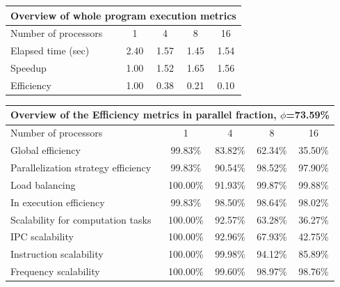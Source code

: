 \begin{tabular}{|l|c|c|c|c|}
\hline
\multicolumn{5}{|c|}{Overview of whole program execution metrics} \\
\hline
\hline
Number of processors & 1 & 4 & 8 & 16 \\
\hline
Elapsed time (sec)      &       2.40 &       1.57 &       1.45 &       1.54 \\
\hline
Speedup                 &       1.00 &       1.52 &       1.65 &       1.56 \\
\hline
Efficiency              &       1.00 &       0.38 &       0.21 &       0.10 \\
\hline
\end{tabular}
\vspace{2mm}
\begin{tabular}{|l|c|c|c|c|}
\hline
\multicolumn{5}{|c|}{Overview of the Efficiency metrics in parallel fraction, $\phi$=73.59\%} \\
\hline
\hline
Number of processors & 1 & 4 & 8 & 16 \\
\hline
\hline
Global efficiency                      &     99.83\% &     83.82\% &     62.34\% &     35.50\% \\
\hline
\hline
Parallelization strategy efficiency &     99.83\% &     90.54\% &     98.52\% &     97.90\% \\
\hline
Load balancing                   &    100.00\% &     91.93\% &     99.87\% &     99.88\% \\
In execution efficiency          &     99.83\% &     98.50\% &     98.64\% &     98.02\% \\
\hline
\hline
Scalability for computation tasks   &    100.00\% &     92.57\% &     63.28\% &     36.27\% \\
\hline
IPC scalability                  &    100.00\% &     92.96\% &     67.93\% &     42.75\% \\
Instruction scalability          &    100.00\% &     99.98\% &     94.12\% &     85.89\% \\
Frequency scalability            &    100.00\% &     99.60\% &     98.97\% &     98.76\% \\
\hline
\end{tabular}
\vspace{2mm}
